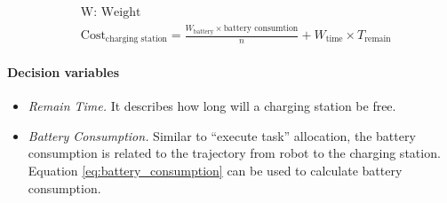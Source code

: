 \begin{equation}	
\label{eq:charging_station_cost}
\begin{aligned}
	& \mbox{W: Weight } \\
	& \mbox{Cost}_{\mbox{charging station}} = \frac{W_{\mbox{battery}} \times \mbox{battery consumtion}}{n} + W_{\mbox{time}} \times T_{\mbox{remain}}
\end{aligned}
\end{equation}


\paragraph{Decision variables}
\begin{itemize}
	\item \textsl{Remain Time.} It describes how long will a charging station be free. 
	\item \textsl{Battery Consumption.} Similar to ``execute task'' allocation, the battery consumption is related to the trajectory from robot to the charging station. Equation \ref{eq:battery_consumption} can be used to calculate battery consumption.
\end{itemize}

